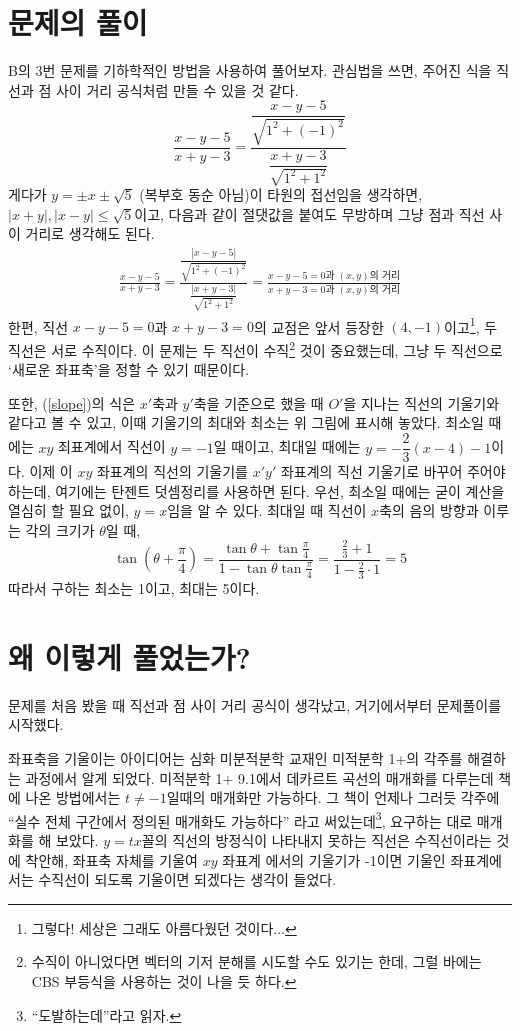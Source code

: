 \documentclass{scrartcl}
\title{\doctitle}
\author{Project Eclipse (손량)}
\date{Last compiled on: \today, \currenttime}
\begin{document}
\maketitle

\section{문제의 풀이}
B의 3번 문제를 기하학적인 방법을 사용하여 풀어보자. 관심법을 쓰면, 주어진 식을 직선과 점 사이 거리 공식처럼 만들 수 있을 것 같다.
\[\frac{x-y-5}{x+y-3}=\frac{\dfrac{x-y-5}{\sqrt{1^2+(-1)^2}}}{\dfrac{x+y-3}{\sqrt{1^2+1^2}}}\]
게다가 \(y=\pm x\pm\sqrt{5}\) (복부호 동순 아님)이 타원의 접선임을 생각하면, \(|x+y|,|x-y|\leq\sqrt{5}\)이고, 다음과 같이 절댓값을 붙여도 무방하며 그냥 점과 직선 사이 거리로 생각해도 된다.
\begin{align}\label{slope}\frac{x-y-5}{x+y-3}=\frac{\dfrac{|x-y-5|}{\sqrt{1^2+(-1)^2}}}{\dfrac{|x+y-3|}{\sqrt{1^2+1^2}}}=\frac{\text{\(x-y-5=0\)과 \((x,y)\)의 거리}}{\text{\(x+y-3=0\)과 \((x,y)\)의 거리}}\end{align}
한편, 직선 \(x-y-5=0\)과 \(x+y-3=0\)의 교점은 앞서 등장한 \((4,-1)\)이고\footnote{그렇다! 세상은 그래도 아름다웠던 것이다...}, 두 직선은 서로 수직이다. 이 문제는 두 직선이 수직\footnote{수직이 아니었다면 벡터의 기저 분해를 시도할 수도 있기는 한데, 그럴 바에는 CBS 부등식을 사용하는 것이 나을 듯 하다.} 것이 중요했는데, 그냥 두 직선으로 `새로운 좌표축'을 정할 수 있기 때문이다.
\begin{figure}[H]
\centering

\end{figure}
또한, (\ref{slope})의 식은 \(x'\)축과 \(y'\)축을 기준으로 했을 때 \(O'\)을 지나는 직선의 기울기와 같다고 볼 수 있고, 이때 기울기의 최대와 최소는 위 그림에 표시해 놓았다. 최소일 때에는 \(xy\) 죄표계에서 직선이 \(y=-1\)일 때이고, 최대일 때에는 \(y=-\dfrac{2}{3}(x-4)-1\)이다. 이제 이 \(xy\) 좌표계의 직선의 기울기를 \(x'y'\) 좌표계의 직선 기울기로 바꾸어 주어야 하는데, 여기에는 탄젠트 덧셈정리를 사용하면 된다. 우선, 최소일 때에는 굳이 계산을 열심히 할 필요 없이, \(y=x\)임을 알 수 있다. 최대일 때 직선이 \(x\)축의 음의 방향과 이루는 각의 크기가 \(\theta\)일 때,
\[\tan\left(\theta+\frac{\pi}{4}\right)=\frac{\tan\theta+\tan\frac{\pi}{4}}{1-\tan\theta\tan\frac{\pi}{4}}=\frac{\frac{2}{3}+1}{1-\frac{2}{3}\cdot1}=5\]
따라서 구하는 최소는 1이고, 최대는 5이다.

\section{왜 이렇게 풀었는가?}
문제를 처음 봤을 때 직선과 점 사이 거리 공식이 생각났고, 거기에서부터 문제풀이를 시작했다.

좌표축을 기울이는 아이디어는 심화 미분적분학 교재인 미적분학 1+의 각주를 해결하는 과정에서 알게 되었다. 미적분학 1+ 9.1에서 데카르트 곡선의 매개화를 다루는데 책에 나온 방법에서는 \(t\neq -1\)일때의 매개화만 가능하다. 그 책이 언제나 그러듯 각주에 ``실수 전체 구간에서 정의된 매개화도 가능하다'' 라고 써있는데\footnote{``도발하는데''라고 읽자.}, 요구하는 대로 매개화를 해 보았다. \(y=tx\)꼴의 직선의 방정식이 나타내지 못하는 직선은 수직선이라는 것에 착안해, 좌표축 자체를 기울여 \(xy\) 좌표계 에서의 기울기가 -1이면 기울인 좌표계에서는 수직선이 되도록 기울이면 되겠다는 생각이 들었다.
\end{document}
